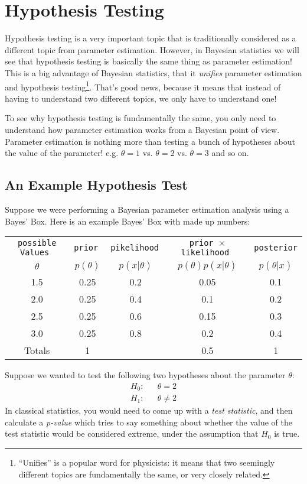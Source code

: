\chapter{Hypothesis Testing}
Hypothesis testing is a very important topic that is traditionally considered
as a different topic from parameter estimation. However, in Bayesian statistics
we will see that hypothesis testing is basically the same thing as parameter
estimation! This is a big advantage of Bayesian statistics, that it {\it unifies}
parameter estimation and hypothesis
testing\footnote{``Unifies'' is a popular word for physicists: it means that
two seemingly different topics are fundamentally the same, or very closely
related.}. That's good news, because it means that instead of having to
understand two different topics, we only have to understand one!

To see why hypothesis testing is fundamentally the same, you only need to
understand how parameter estimation works from a Bayesian point of view.
Parameter estimation is nothing more than testing a bunch of hypotheses about
the value of the parameter! e.g. $\theta=1$ vs. $\theta=2$ vs. $\theta=3$ and
so on.

\section{An Example Hypothesis Test}
Suppose we were performing a Bayesian parameter estimation analysis using a
Bayes' Box. Here is an example Bayes' Box with made up numbers:

\begin{table}[h!]
\begin{center}
\begin{tabular}{|c|c|c|c|c|}
\hline
\tt{possible Values} & \tt{prior} & \tt{pikelihood} & \tt{prior} $\times$ \tt{likelihood} & \tt{posterior}\\
$\theta$ & $p(\theta)$ & $p(x|\theta)$ & $p(\theta)p(x|\theta)$ & $p(\theta|x)$\\
\hline
1.5 & 0.25 & 0.2 & 0.05 & 0.1\\
2.0 & 0.25 & 0.4 & 0.1 & 0.2\\
2.5 & 0.25 & 0.6 & 0.15 & 0.3\\
3.0 & 0.25 & 0.8 & 0.2 & 0.4\\
\hline
Totals & 1 & & 0.5 & 1\\
\hline
\end{tabular}
\end{center}
\end{table}
Suppose we wanted to test the following two hypotheses about the parameter $\theta$:
\begin{eqnarray}
H_0: && \theta = 2\\
H_1: && \theta \neq 2
\end{eqnarray}
In classical statistics, you would need to come up with a {\it test statistic},
and then calculate a {\it p-value} which tries to say something about whether
the value of the test statistic would be considered extreme, under the
assumption that $H_0$ is true.

